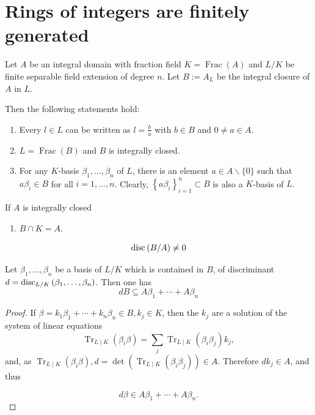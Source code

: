 \documentclass[12pt, oneside]{book}
\begin{document}
\section{Rings of integers are finitely generated}
Let $A$ be an integral domain with fraction field $K=\operatorname{Frac}(A)$ and $L/K$ be finite separable field extension of degree $n$.
Let $B:=A_L$ be the integral closure of $A$ in $L$.
\begin{proposition}
    \label{pro: pro of integral closure}
    Then the following statements hold:
    \begin{enumerate}
        \item
              Every $l \in L$ can be written as $l=\frac{b}{a}$ with $b \in B$ and $0 \neq a \in A$.
        \item
              $L=\operatorname{Frac}(B)$ and $B$ is integrally closed.
        \item
              For any $K$-basis $\beta_1, \ldots, \beta_n$ of $L$, there is an element $a \in A \backslash\{0\}$ such that $a \beta_i \in B$ for all $i=1, \ldots, n$.
              Clearly, $\left\{a\beta_i\right\}_{i=1}^n\subset B$ is also a $K$-basis of $L$.
    \end{enumerate}
    If $A$ is integrally closed
    \begin{enumerate}[resume]

        \item
              $B \cap K=A$.
    \end{enumerate}
\end{proposition}

\begin{corollary}
    \begin{equation*}
        \operatorname{disc}\left(B/A\right)\neq 0
    \end{equation*}
\end{corollary}
\begin{lemma}
    Let $\beta_1, \ldots, \beta_n$ be a basis of $L/K$ which is contained in $B$, of discriminant $d=\operatorname{disc}_{L/K}\left(\beta_1, \ldots, \beta_n\right)$. Then one has
    \begin{equation*}
        d B \subseteq A \beta_1+\cdots+A \beta_n
    \end{equation*}
    \begin{proof}
        If $\beta=k_1 \beta_1+\cdots+k_n \beta_n \in B, k_j \in K$, then the $k_j$ are a solution of the system of linear equations
        \begin{equation*}
            \operatorname{Tr}_{L \mid K}\left(\beta_i \beta\right)=\sum_j \operatorname{Tr}_{L \mid K}\left(\beta_i \beta_j\right) k_j,
        \end{equation*}
        and, as $\operatorname{Tr}_{L \mid K}\left(\beta_i \beta\right), d=\det \left(\operatorname{Tr}_{L \mid K}\left(\beta_i \beta_j\right)\right)\in A$.
        Therefore $d k_j \in A$, and thus

        \begin{equation*}
            d \beta \in A \beta_1+\cdots+A \beta_n .
        \end{equation*}
    \end{proof}
\end{lemma}
\end{document}
